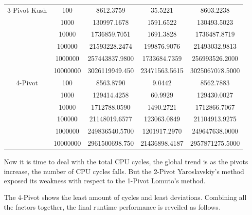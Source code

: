 \documentclass{article}
\begin{document}
\begin{center}
\begin{tabular}{ |c c | c c c| }
        3-Pivot Kush    & 100      & 8612.3759      & 35.5221       & 8603.2238 \\
                        & 1000     & 130997.1678    & 1591.6522     & 130493.5023 \\
                        & 10000    & 1736859.7051   & 1691.3828     & 1736487.8719 \\
                        & 100000   & 21593228.2474  & 199876.9076   & 21493032.9813 \\
                        & 1000000  & 257443837.9800 & 1733684.7359  & 256993526.2000 \\
                        & 10000000 & 3026119949.450 & 23471563.5615 & 3025067078.5000 \\
        \hline
        4-Pivot         & 100      & 8563.8790      & 9.0442        & 8562.7883 \\
                        & 1000     & 129414.4258    & 60.9929       & 129430.0027 \\
                        & 10000    & 1712788.0590   & 1490.2721     & 1712866.7067 \\
                        & 100000   & 21148019.6577  & 123063.0849   & 21104913.9275 \\
                        & 1000000  & 249836540.5700 & 1201917.2970  & 249647638.0000 \\
                        & 10000000 & 2961500698.750 & 21436898.4187 & 2957871275.5000 \\
        \hline
    \end{tabular}
\end{center}

Now it is time to deal with the total CPU cycles, the global trend is as the pivots increase, the number of CPU cycles falls.
But the 2-Pivot Yaroslavskiy's method exposed its weakness with respect to the 1-Pivot Lomuto's method. 

The 4-Pivot shows the least amount of cycles and least deviations. Combining all the factors together, the final runtime performance is reveiled as follows.
\end{document}
